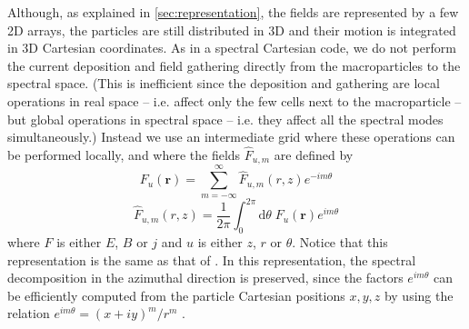 \documentclass[1p,times]{elsarticle}
\newcommand{\TInteg}[1]{\int_{0}^{2\pi} \!\!\!\!\!\! \mathrm{d}#1}
\renewcommand{\vec}[1]{\boldsymbol{#1}}
\begin{document}
Although, as explained in \cref{sec:representation}, the fields are represented by a few
2D arrays, the particles are still distributed in 3D and their motion
is integrated in 3D Cartesian coordinates. As in a spectral Cartesian
code, we do not perform the current deposition and field gathering directly from the
macroparticles to the spectral space. (This is inefficient since the
deposition and gathering are local operations in real space -- i.e. affect
only the few cells next to the macroparticle -- but global operations
in spectral space -- i.e. they affect all the spectral modes
simultaneously.) Instead we use an intermediate grid where these
operations can be performed locally, and where the fields $\hat{F}_{u,m}$
are defined by
\begin{equation} 
\label{eq:IntermBwTrans}
F_u(\vec{r}) = \sum_{m=-\infty}^{\infty} \hat{F}_{u,m}(r,z)
e^{-im\theta} 
\end{equation}
\begin{equation}
\label{eq:IntermFwTrans}
\hat{F}_{u,m}(r,z) = \frac{1}{2\pi} \TInteg{\theta} \;
F_u(\vec{r})e^{im\theta}
\end{equation}
where ${F}$ is either ${E}$, ${B}$ or
${j}$ and $u$ is either $z$, $r$ or $\theta$. Notice that this representation is the
same as that of \cite{Lifschitz, Davidson}. In this
representation, the spectral decomposition in the azimuthal
direction is preserved, since the factors $e^{im\theta}$ can be efficiently computed from the
particle Cartesian positions $x,y,z$ by using the relation $e^{im\theta} = (x+iy)^m/r^m$
\cite{Lifschitz}.
\end{document}
